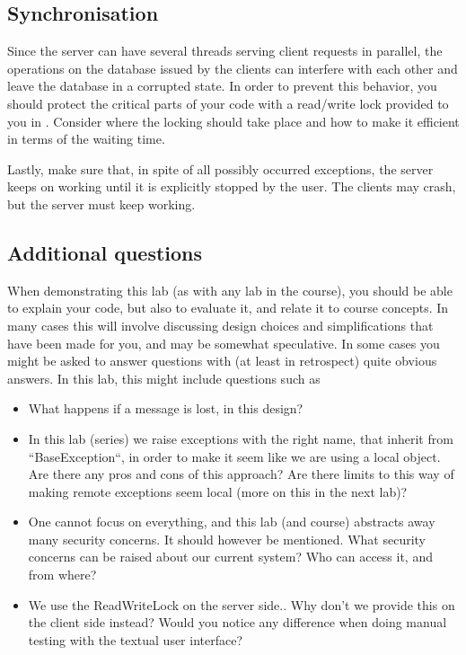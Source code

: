 \documentclass[a4paper]{article}
\begin{document}
\subsection{Synchronisation}

Since the server can have several threads serving client requests in
parallel, the operations on the database issued by the clients can
interfere with each other and leave the database in a corrupted
state. In order to prevent this behavior, you should protect the
critical parts of your code with a read/write lock provided to you in
. Consider where the locking should take
place and how to make it efficient in terms of the waiting time.

Lastly, make sure that, in spite of all possibly occurred exceptions,
the server keeps on working until it is explicitly stopped by the
user. The clients may crash, but the server must keep working.

\subsection{Additional questions}
When demonstrating this lab (as with any lab in the course), you
should be able to explain your code, but also to evaluate it, and
relate it to course concepts. In many cases this will involve
discussing design choices and simplifications that have been made for
you, and may be somewhat speculative. In some cases you might be asked
to answer questions with (at least in retrospect) quite obvious
answers. In this lab, this might include questions such as

\begin{itemize}
  \item What happens if a message is lost, in this design?
  \item In this lab (series) we raise exceptions with the right name,
    that inherit from ``BaseException``, in order to make it seem like
    we are using a local object. Are there any pros and cons of this
    approach? Are there limits to this way of making remote exceptions
    seem local (more on this in the next lab)?
  \item One cannot focus on everything, and this lab (and course)
    abstracts away many security concerns. It should however be
    mentioned. What security concerns can be raised about our current
    system? Who can access it, and from where?
  \item We use the ReadWriteLock on the server side.. Why don't we
    provide this on the client side instead? Would you notice any
    difference when doing manual testing with the textual user
    interface?
\end{itemize}
\end{document}
